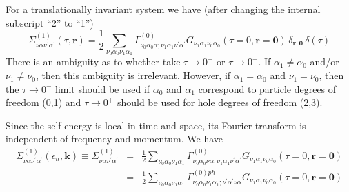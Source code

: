For a translationally invariant system we have (after changing
the internal subscript ``2'' to ``1'')
\begin{equation}
\Sigma^{(1)}_{\nu\alpha \nu^{\prime}\alpha^{\prime}}(\tau,\mathbf{r}) =
\frac{1}{2} \sum_{\nu_0\alpha_0 \nu_1\alpha_1}
\Gamma^{(0)}_{\nu_0\alpha_0\alpha;\nu_1 \alpha_1 \nu^{\prime}\alpha^{\prime}}
G_{\nu_1\alpha_1 \nu_0\alpha_0}(\tau=0,\mathbf{r}=\mathbf{0})\,
\delta_{\mathbf{r},\mathbf{0}} \, \delta(\tau)
\end{equation}
There is an ambiguity as to whether take $\tau \to 0^+$ or
$\tau \to 0^-$.  If $\alpha_1 \neq \alpha_0$ and/or $\nu_1 \neq \nu_0$, 
then this
ambiguity is irrelevant.  However, if $\alpha_1 = \alpha_0$
and $\nu_1 = \nu_0$,
then the $\tau \to 0^-$ limit should be used if $\alpha_0$
and $\alpha_1$ correspond to particle degrees of freedom (0,1)
and $\tau \to 0^+$ should be used for hole degrees of freedom
(2,3).

Since the self-energy is local in time and space, its Fourier
transform is independent of frequency and momentum.  We have
\begin{eqnarray}
\Sigma^{(1)}_{\nu\alpha \nu^{\prime}\alpha^{\prime}}(\epsilon_n,\mathbf{k}) \equiv
\Sigma^{(1)}_{\nu\alpha \nu^{\prime}\alpha^{\prime}} &  = &
\frac{1}{2} \sum_{\nu_0\alpha_0 \nu_1\alpha_1}
\Gamma^{(0)}_{\nu_0\alpha_0\nu\alpha; \nu_1\alpha_1 \nu^{\prime}\alpha^{\prime}}
G_{\nu_1\alpha_1 \nu_0\alpha_0}(\tau=0,\mathbf{r}=\mathbf{0}) \\
& = & \frac{1}{2} \sum_{\nu_0\alpha_0 \nu_1\alpha_1}
\Gamma^{(0)ph}_{\nu_0 \alpha_0 \nu_1 \alpha_1;
\nu^{\prime}\alpha^{\prime} \nu \alpha}
G_{\nu_1\alpha_1 \nu_0\alpha_0}(\tau=0,\mathbf{r}=\mathbf{0})
\end{eqnarray}

